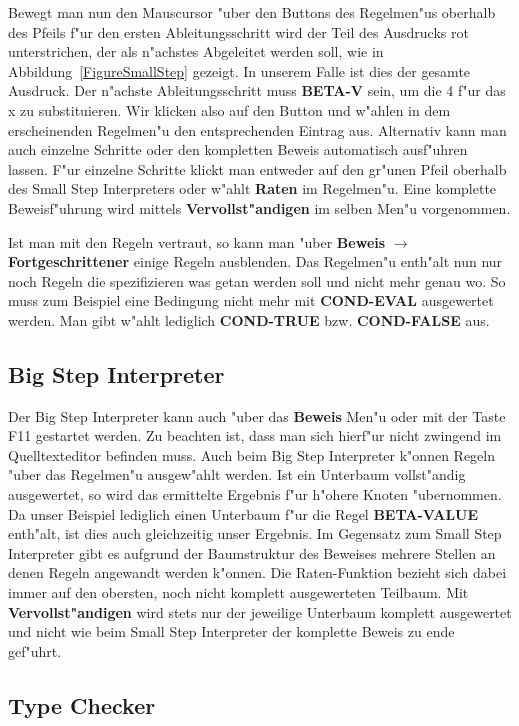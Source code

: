 Bewegt man nun den Mauscursor "uber den Buttons des Regelmen"us
oberhalb des Pfeils f"ur den ersten Ableitungsschritt wird der Teil
des Ausdrucks rot unterstrichen, der als n"achstes Abgeleitet werden
soll, wie in Abbildung~\ref{FigureSmallStep} gezeigt.
In unserem Falle ist dies der gesamte Ausdruck. Der n"achste
Ableitungsschritt muss {\bf BETA-V} sein, um die 4 f"ur das x zu
substituieren. Wir klicken also auf den Button und w"ahlen in dem
erscheinenden Regelmen"u den entsprechenden Eintrag aus. Alternativ
kann man auch einzelne Schritte oder den kompletten Beweis
automatisch ausf"uhren lassen. F"ur einzelne Schritte klickt man
entweder auf den gr"unen Pfeil oberhalb des Small Step Interpreters
oder w"ahlt {\bf Raten} im Regelmen"u. Eine komplette Beweisf"uhrung
wird mittels {\bf Vervollst"andigen} im selben Men"u vorgenommen.

Ist man mit den Regeln vertraut, so kann man "uber {\bf Beweis}
$\rightarrow$ {\bf Fortgeschrittener} einige Regeln ausblenden. Das
Regelmen"u enth"alt nun nur noch Regeln die spezifizieren was getan
werden soll und nicht mehr genau wo. So muss zum Beispiel eine
Bedingung nicht mehr mit {\bf COND-EVAL} ausgewertet werden. Man
gibt w"ahlt lediglich {\bf COND-TRUE} bzw. {\bf COND-FALSE} aus.

\subsection{Big Step Interpreter}
Der Big Step Interpreter kann auch "uber das {\bf Beweis} Men"u oder
mit der Taste F11 gestartet werden. Zu beachten ist, dass man sich
hierf"ur nicht zwingend im Quelltexteditor befinden muss. Auch beim
Big Step Interpreter k"onnen Regeln "uber das Regelmen"u ausgew"ahlt
werden. Ist ein Unterbaum vollst"andig ausgewertet, so wird das
ermittelte Ergebnis f"ur h"ohere Knoten "ubernommen. Da unser
Beispiel lediglich einen Unterbaum f"ur die Regel {\bf BETA-VALUE}
enth"alt, ist dies auch gleichzeitig unser Ergebnis. Im Gegensatz
zum Small Step Interpreter gibt es aufgrund der Baumstruktur des
Beweises mehrere Stellen an denen Regeln angewandt werden k"onnen.
Die Raten-Funktion bezieht sich dabei immer auf den obersten, noch
nicht komplett ausgewerteten Teilbaum. Mit {\bf Vervollst"andigen}
wird stets nur der jeweilige Unterbaum komplett ausgewertet und
nicht wie beim Small Step Interpreter der komplette Beweis zu ende
gef"uhrt.

\subsection{Type Checker}

